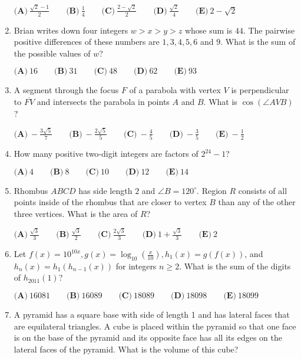 \documentclass{article}
\begin{document}
\begin{enumerate}[label=\arabic*., itemsep=0.5em]
$\textbf{(A)}\ \frac{\sqrt{2} - 1}{2} \qquad \textbf{(B)}\ \frac{1}{4} \qquad \textbf{(C)}\ \frac{2 - \sqrt{2}}{2} \qquad \textbf{(D)}\ \frac{\sqrt{2}}{4} \qquad \textbf{(E)}\ 2 - \sqrt{2}$\par \vspace{0.5em}\item Brian writes down four integers $w > x > y > z$ whose sum is $44$. The pairwise positive differences of these numbers are $1, 3, 4, 5, 6$ and $9$. What is the sum of the possible values of $w$?

$\textbf{(A)}\ 16 \qquad \textbf{(B)}\ 31 \qquad \textbf{(C)}\ 48 \qquad \textbf{(D)}\ 62 \qquad \textbf{(E)}\ 93$\par \vspace{0.5em}\item A segment through the focus $F$ of a parabola with vertex $V$ is perpendicular to $\overline{FV}$ and intersects the parabola in points $A$ and $B$. What is $\cos\left(\angle AVB\right)$?

$\textbf{(A)}\ -\frac{3\sqrt{5}}{7} \qquad \textbf{(B)}\ -\frac{2\sqrt{5}}{5} \qquad \textbf{(C)}\ -\frac{4}{5} \qquad \textbf{(D)}\ -\frac{3}{5} \qquad \textbf{(E)}\ -\frac{1}{2}$\par \vspace{0.5em}\item How many positive two-digit integers are factors of $2^{24}-1$?

$\textbf{(A)}\ 4 \qquad \textbf{(B)}\ 8 \qquad \textbf{(C)}\ 10 \qquad \textbf{(D)}\ 12 \qquad \textbf{(E)}\ 14$\par \vspace{0.5em}\item Rhombus $ABCD$ has side length $2$ and $\angle B = 120^{\circ}$. Region $R$ consists of all points inside of the rhombus that are closer to vertex $B$ than any of the other three vertices. What is the area of $R$?

$\textbf{(A)}\ \frac{\sqrt{3}}{3} \qquad \textbf{(B)}\ \frac{\sqrt{3}}{2} \qquad \textbf{(C)}\ \frac{2\sqrt{3}}{3} \qquad \textbf{(D)}\ 1 + \frac{\sqrt{3}}{3} \qquad \textbf{(E)}\ 2$\par \vspace{0.5em}\item Let $f(x) = 10^{10x}, g(x) = \log_{10}\left(\frac{x}{10}\right), h_1(x) = g(f(x))$, and $h_n(x) = h_1(h_{n-1}(x))$ for integers $n \geq 2$. What is the sum of the digits of $h_{2011}(1)$?

$\textbf{(A)}\ 16081 \qquad \textbf{(B)}\ 16089 \qquad \textbf{(C)}\ 18089 \qquad \textbf{(D)}\ 18098 \qquad \textbf{(E)}\ 18099$\par \vspace{0.5em}\item A pyramid has a square base with side of length 1 and has lateral faces that are equilateral triangles. A cube is placed within the pyramid so that one face is on the base of the pyramid and its opposite face has all its edges on the lateral faces of the pyramid. What is the volume of this cube?


\end{enumerate}
\end{document}
